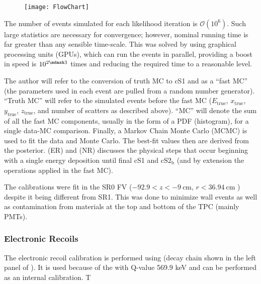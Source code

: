\begin{figure}
\centering
\texttt{[image: FlowChart]}
\label{fig:er_nr_calibrations_parameter_determ_flow_chart}
\end{figure}

The number of events simulated for each likelihood iteration is $\mathcal{O}(10^6)$.  Such large statistics are necessary for convergence;
however, nominal running time is far greater than any sensible time-scale.  This was solved by using graphical processing units (GPUs),
which can run the events in parallel, providing a boost in speed is $10^{2 \mdash 3}$ times and reducing the required time to a
reasonable level.

The author will refer to the conversion of truth MC to cS1 and \cstwob as a ``fast MC'' (the parameters used in each event are pulled
from a random number generator).  ``Truth MC'' will refer to the simulated events before the fast MC ($E_{\mathrm{true}}$,
$x_{\mathrm{true}}$, $y_{\mathrm{true}}$, $z_{\mathrm{true}}$, and number
of scatters as described above).  ``MC'' will denote the sum of all the fast MC components, usually in the form of a PDF (histogram), for
a single data-MC comparison.  Finally, a Markov Chain Monte Carlo (MCMC) is used to fit the data and Monte Carlo.  The best-fit values
then are derived from the posterior.   (ER) and
 (NR) discusses the physical steps that occur beginning with a single energy
deposition until final cS1 and $\mathrm{cS2_b}$ (and by extension the operations applied in the fast MC).

The calibrations were fit in the SR0 FV ($-92.9 < z < -9\ \mathrm{cm}$, $r < 36.94\ \mathrm{cm}$
) despite it being different from SR1.  This was done to minimize wall events as well as
contamination from materials at the top and bottom of the TPC (mainly PMTs).



\subsubsection{Electronic Recoils}
\label{subsubsec:er_nr_calibrations_parameter_determ_er}
The electronic recoil calibration is performed using  (decay chain shown in the left panel of
).  It is used because of the  \betadecay with Q-value 569.9 keV and can be performed
as an internal calibration.  T

